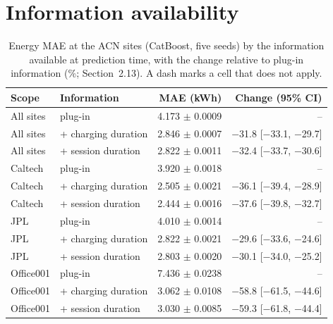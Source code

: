 \section{Information availability}
\begin{table}[H]\centering\small
\caption{Energy MAE at the ACN sites (CatBoost, five seeds) by the information available at prediction time, with the change relative to plug-in information (\%; Section~2.13). A dash marks a cell that does not apply.}\label{tab:s-avail}
\begin{tabular}{llrr}\toprule
Scope & Information & MAE (kWh) & Change (95\% CI) \\\midrule
All sites & plug-in & 4.173 $\pm$ 0.0009 & -- \\
All sites & + charging duration & 2.846 $\pm$ 0.0007 & $-$31.8 [$-$33.1, $-$29.7] \\
All sites & + session duration & 2.822 $\pm$ 0.0011 & $-$32.4 [$-$33.7, $-$30.6] \\
Caltech & plug-in & 3.920 $\pm$ 0.0018 & -- \\
Caltech & + charging duration & 2.505 $\pm$ 0.0021 & $-$36.1 [$-$39.4, $-$28.9] \\
Caltech & + session duration & 2.444 $\pm$ 0.0016 & $-$37.6 [$-$39.8, $-$32.7] \\
JPL & plug-in & 4.010 $\pm$ 0.0014 & -- \\
JPL & + charging duration & 2.822 $\pm$ 0.0021 & $-$29.6 [$-$33.6, $-$24.6] \\
JPL & + session duration & 2.803 $\pm$ 0.0020 & $-$30.1 [$-$34.0, $-$25.2] \\
Office001 & plug-in & 7.436 $\pm$ 0.0238 & -- \\
Office001 & + charging duration & 3.062 $\pm$ 0.0108 & $-$58.8 [$-$61.5, $-$44.6] \\
Office001 & + session duration & 3.030 $\pm$ 0.0085 & $-$59.3 [$-$61.8, $-$44.4] \\
\bottomrule\end{tabular}\end{table}

